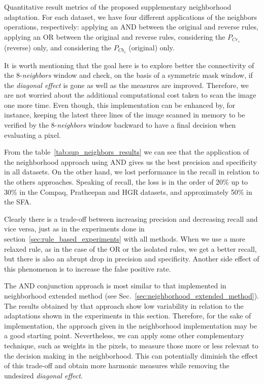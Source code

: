\begin{table}[ht]
\caption[Quantitative result metrics of the proposed supplementary neighborhood adaptation]{Quantitative result metrics of the proposed supplementary neighborhood adaptation. For each dataset, we have four different applications of the neighbors operations, respectively: applying an AND between the original and reverse rules, applying an OR between the original and reverse rules, considering the $P_{Cr_{s}}$ (reverse) only, and considering the $P_{Cb_{s}}$ (original) only.}
\label{tab:sup_neighbors_results}

\end{table}

It is worth mentioning that the goal here is to explore better the connectivity of the 8-\textit{neighbors} window and check, on the basis of a symmetric mask window, if the \textit{diagonal effect} is gone as well as the measures are improved. Therefore, we are not worried about the additional computational cost taken to scan the image one more time. Even though, this implementation can be enhanced by, for instance, keeping the latest three lines of the image scanned in memory to be verified by the 8-\textit{neighbors} window backward to have a final decision when evaluating a pixel.

From the table~\ref{tab:sup_neighbors_results} we can see that the application of the neighborhood approach using AND gives us the best precision and specificity in all datasets. On the other hand, we lost performance in the recall in relation to the others approaches. Speaking of recall, the loss is in the order of 20\% up to 30\% in the Compaq, Pratheepan and HGR datasets, and approximately 50\% in the SFA.

Clearly there is a trade-off between increasing precision and decreasing recall and vice versa, just as in the experiments done in section~\ref{sec:rule_based_experiments} with all methods. When we use a more relaxed rule, as in the case of the OR or the isolated rules, we get a better recall, but there is also an abrupt drop in precision and specificity. Another side effect of this phenomenon is to increase the false positive rate.

The AND conjunction approach is most similar to that implemented in neighborhood extended method (see Sec.~\ref{sec:neighborhood_extended_method}). The results obtained by that approach show low variability in relation to the adaptations shown in the experiments in this section. Therefore, for the sake of implementation, the approach given in the neighborhood implementation may be a good starting point. Nevertheless, we can apply some other complementary technique, such as weights in the pixels, to measure those more or less relevant to the decision making in the neighborhood. This can potentially diminish the effect of this trade-off and obtain more harmonic measures while removing the undesired \textit{diagonal effect}.



